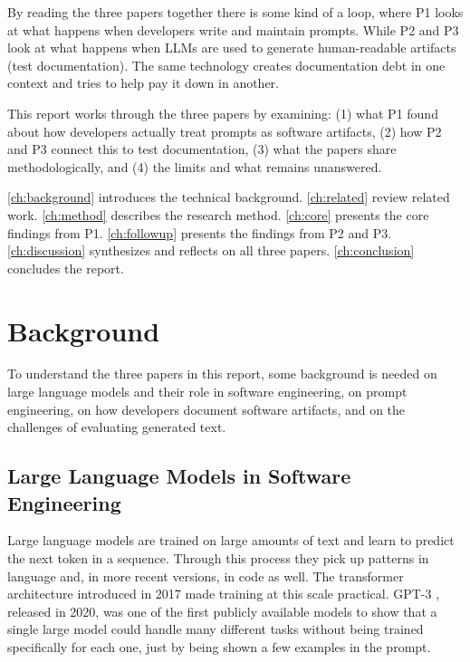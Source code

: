 \documentclass[
    pdftex,
    final,
    11pt,
    a4paper,
    parskip=false,
    oneside,
    footheight=0mm,
    footinclude=false,
    toc=bibliography
]{scrbook}
\begin{document}
By reading the three papers together there is some kind of a loop, where P1 looks at what happens when developers write and maintain prompts. While P2 and P3 look at what happens when LLMs are used to generate human-readable artifacts (test documentation). The same technology creates documentation debt in one context and tries to help pay it down in another.

This report works through the three papers by examining: (1) what P1 found about how developers actually treat prompts as software artifacts, (2) how P2 and P3 connect this to test documentation, (3) what the papers share methodologically, and (4) the limits and what remains unanswered.

\autoref{ch:background} introduces the technical background. \autoref{ch:related} review related work. \autoref{ch:method} describes the research method. \autoref{ch:core} presents the core findings from P1. \autoref{ch:followup} presents the findings from P2 and P3. \autoref{ch:discussion} synthesizes and reflects on all three papers. \autoref{ch:conclusion} concludes the report.


\chapter{Background}
\label{ch:background}

To understand the three papers in this report, some background is needed on large language models and their role in software engineering, on prompt engineering, on how developers document software artifacts, and on the challenges of evaluating generated text.

\section{Large Language Models in Software Engineering}

Large language models are trained on large amounts of text and learn to predict the next token in a sequence. Through this process they pick up patterns in language and, in more recent versions, in code as well. The transformer architecture introduced in 2017 made training at this scale practical. GPT-3 \cite{Brown2020}, released in 2020, was one of the first publicly available models to show that a single large model could handle many different tasks without being trained specifically for each one, just by being shown a few examples in the prompt.
\end{document}
